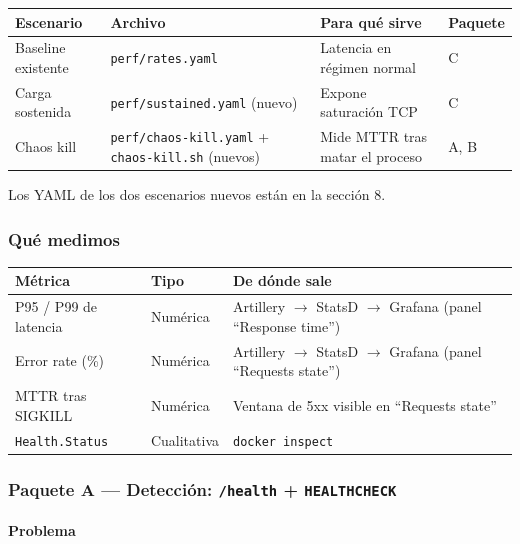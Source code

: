 \begin{table}[H]
\centering
\setlength{\tabcolsep}{2pt}
\begin{tabular}{llp{4cm}l}
\toprule
\textbf{Escenario} & \textbf{Archivo} & \textbf{Para qué sirve} & \textbf{Paquete} \\
\midrule
Baseline existente & \texttt{perf/rates.yaml} & Latencia en régimen normal & C \\
Carga sostenida & \texttt{perf/sustained.yaml} (nuevo) & Expone saturación TCP & C \\
Chaos kill & \texttt{perf/chaos-kill.yaml} + \texttt{chaos-kill.sh} (nuevos) & Mide MTTR tras matar el proceso & A, B \\
\bottomrule
\end{tabular}
\end{table}

Los YAML de los dos escenarios nuevos están en la sección 8.

\subsubsection{Qué medimos}

\begin{table}[H]
\centering
\begin{tabular}{lll}
\toprule
\textbf{Métrica} & \textbf{Tipo} & \textbf{De dónde sale} \\
\midrule
P95 / P99 de latencia & Numérica & Artillery $\rightarrow$ StatsD $\rightarrow$ Grafana (panel ``Response time'') \\
Error rate (\%) & Numérica & Artillery $\rightarrow$ StatsD $\rightarrow$ Grafana (panel ``Requests state'') \\
MTTR tras SIGKILL & Numérica & Ventana de 5xx visible en ``Requests state'' \\
\texttt{Health.Status} & Cualitativa & \texttt{docker inspect} \\
\bottomrule
\end{tabular}
\end{table}

\subsubsection{Paquete A — Detección: \texttt{/health} + \texttt{HEALTHCHECK}}

\paragraph{Problema}

